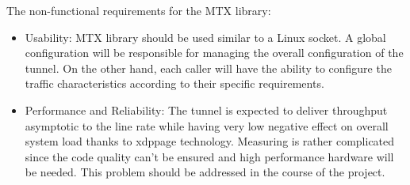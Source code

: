 The non-functional requirements for the \ac{MTX} library:
\begin{itemize}
    \item Usability: \ac{MTX} library should be used similar to a Linux socket. A global configuration will be responsible for managing the overall configuration of the tunnel. On the other hand, each caller will have the ability to configure the traffic characteristics according to their specific requirements.
    \item Performance and Reliability: The tunnel is expected to deliver throughput asymptotic to the line rate while having very low negative effect on overall system load thanks to \ac{xdppage} technology. Measuring is rather complicated since the code quality can't be ensured and high performance hardware will be needed. This problem should be addressed in the course of the project.
\end{itemize}
